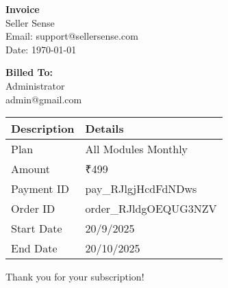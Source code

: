 \documentclass[a4paper]{article}
\begin{document}
\begin{center}
  \textbf{\large Invoice} \\
  \vspace{0.5cm}
  Seller Sense \\
  Email: support@sellersense.com \\
  Date: \today
\end{center}

\vspace{1cm}

\textbf{Billed To:} \\
Administrator \\
admin@gmail.com \\

\vspace{1cm}

\begin{tabular}{ll}
  \toprule
  \textbf{Description} & \textbf{Details} \\
  \midrule
  Plan & All Modules Monthly \\
  Amount & ₹499 \\
  Payment ID & pay_RJlgjHcdFdNDws \\
  Order ID & order_RJldgOEQUG3NZV \\
  Start Date & 20/9/2025 \\
  End Date & 20/10/2025 \\
  \bottomrule
\end{tabular}

\vspace{1cm}

Thank you for your subscription!
\end{document}
